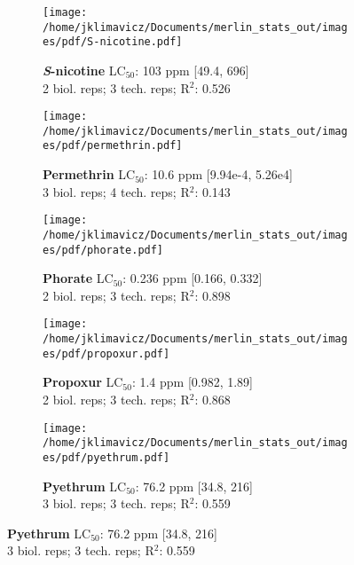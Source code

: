 \documentclass{article}
\begin{document}
\begin{figure}[thp!]
   \begin{subfigure}{0.500\textwidth}
      \centering
      \texttt{[image: /home/jklimavicz/Documents/merlin\_stats\_out/images/pdf/S-nicotine.pdf]}
      \vspace{-0.05cm}
      \caption*{\textbf{\textit{S}-nicotine} LC$_{50}$: 103 ppm [49.4, 696] \\ 
2 biol. reps; 3 tech. reps; R$^2$: 0.526}
      \vspace{0.1cm}
   \end{subfigure}%
   \begin{subfigure}{0.500\textwidth}
      \centering
      \texttt{[image: /home/jklimavicz/Documents/merlin\_stats\_out/images/pdf/permethrin.pdf]}
      \vspace{-0.05cm}
      \caption*{\textbf{Permethrin} LC$_{50}$: 10.6 ppm [9.94e-4, 5.26e4] \\ 
3 biol. reps; 4 tech. reps; R$^2$: 0.143}
      \vspace{0.1cm}
   \end{subfigure}%
\vspace{-0.1cm}
   \begin{subfigure}{0.500\textwidth}
      \centering
      \texttt{[image: /home/jklimavicz/Documents/merlin\_stats\_out/images/pdf/phorate.pdf]}
      \vspace{-0.05cm}
      \caption*{\textbf{Phorate} LC$_{50}$: 0.236 ppm [0.166, 0.332] \\ 
2 biol. reps; 3 tech. reps; R$^2$: 0.898}
      \vspace{0.1cm}
   \end{subfigure}%
   \begin{subfigure}{0.500\textwidth}
      \centering
      \texttt{[image: /home/jklimavicz/Documents/merlin\_stats\_out/images/pdf/propoxur.pdf]}
      \vspace{-0.05cm}
      \caption*{\textbf{Propoxur} LC$_{50}$: 1.4 ppm [0.982, 1.89] \\ 
2 biol. reps; 3 tech. reps; R$^2$: 0.868}
      \vspace{0.1cm}
   \end{subfigure}%
\vspace{-0.1cm}
   \begin{subfigure}{0.500\textwidth}
      \centering
      \texttt{[image: /home/jklimavicz/Documents/merlin\_stats\_out/images/pdf/pyethrum.pdf]}
      \vspace{-0.05cm}
      \caption*{\textbf{Pyethrum} LC$_{50}$: 76.2 ppm [34.8, 216] \\ 
3 biol. reps; 3 tech. reps; R$^2$: 0.559}
      \vspace{0.1cm}
   \end{subfigure}%
\end{figure}
\pagebreak
\end{document}
